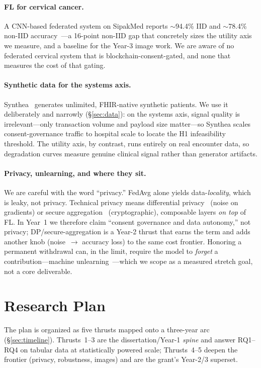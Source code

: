 \documentclass[11pt]{article}
\begin{document}
\paragraph{FL for cervical cancer.}
A CNN-based federated system on SipakMed reports $\sim$94.4\% IID and $\sim$78.4\%
non-IID accuracy~\cite{joynab2024}---a 16-point non-IID gap that concretely sizes
the utility axis we measure, and a baseline for the Year-3 image work. We are
aware of no federated cervical system that is blockchain-consent-gated, and none
that measures the cost of that gating.

\paragraph{Synthetic data for the systems axis.}
Synthea~\cite{synthea} generates unlimited, FHIR-native synthetic patients. We
use it deliberately and narrowly (\S\ref{sec:data}): on the systems axis, signal
quality is irrelevant---only transaction volume and payload size matter---so
Synthea scales consent-governance traffic to hospital scale to locate the H1
infeasibility threshold. The utility axis, by contrast, runs entirely on real
encounter data, so degradation curves measure genuine clinical signal rather
than generator artifacts.

\paragraph{Privacy, unlearning, and where they sit.}
We are careful with the word ``privacy.'' FedAvg alone yields data-\emph{locality},
which is leaky, not privacy. Technical privacy means differential
privacy~\cite{dpsgd} (noise on gradients) or secure aggregation~\cite{secagg}
(cryptographic), composable layers \emph{on top} of FL. In Year~1 we therefore
claim ``consent governance and data autonomy,'' not privacy; DP/secure-aggregation
is a Year-2 thrust that earns the term and adds another knob (noise~$\rightarrow$
accuracy loss) to the same cost frontier. Honoring a permanent withdrawal can, in
the limit, require the model to \emph{forget} a contribution---machine
unlearning~\cite{unlearning}---which we scope as a measured stretch goal, not a
core deliverable.

\section{Research Plan}
The plan is organized as five thrusts mapped onto a three-year arc
(\S\ref{sec:timeline}). Thrusts~1--3 are the dissertation/Year-1 \emph{spine} and
answer RQ1--RQ4 on tabular data at statistically powered scale; Thrusts~4--5
deepen the frontier (privacy, robustness, images) and are the grant's Year-2/3
superset.
\end{document}
